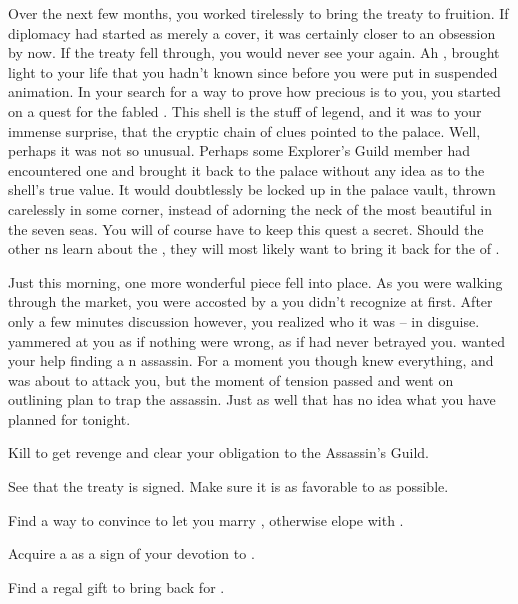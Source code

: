 \documentclass[char]{NeptuneBall}
\begin{document}
Over the next few months, you worked tirelessly to bring the treaty to fruition. If diplomacy had started as merely a cover, it was certainly closer to an obsession by now. If the treaty fell through, you would never see your \cPrincess{} again. Ah \cPrincess{}, \cPrincess{\they} brought light to your life that you hadn't known since before you were put in suspended animation. In your search for a way to prove how precious \cPrincess{} is to you, you started on a quest for the fabled \iGlowShell{}. This shell is the stuff of legend, and it was to your immense surprise, that the cryptic chain of clues pointed to the \pAtlantis{} palace. Well, perhaps it was not so unusual. Perhaps some Explorer's Guild member had encountered one and brought it back to the palace without any idea as to the shell's true value. It would doubtlessly be locked up in the palace vault, thrown carelessly in some corner, instead of adorning the neck of the most beautiful \cPrincess{\mer} in the seven seas. You will of course have to keep this quest a secret. Should the other \pPacifica{}ns learn about the \iGlowShell{}, they will most likely want to bring it back for the \cPacificanRuler{\King} of \pPacifica{}.

Just this morning, one more wonderful piece fell into place. As you were walking through the market, you were accosted by a \cQueen{\mer} you didn't recognize at first. After only a few minutes discussion however, you realized who it was -- \cQueen{} in disguise. \cQueen{\They} yammered at you as if nothing were wrong, as if \cQueen{\they} had never betrayed you. \cQueen{} wanted your help finding a \pPacifica{}n assassin. For a moment you though \cQueen{\they} knew everything, and was about to attack you, but the moment of tension passed and \cQueen{\they} went on outlining \cQueen{\them} plan to trap the assassin. Just as well that \cQueen{\they} has no idea what you have planned for \cQueen{\them} tonight.

\begin{itemz}[Goals]
  \item Kill \cQueen{} to get revenge and clear your obligation to the Assassin's Guild.
  \item See that the treaty is signed. Make sure it is as favorable to \pPacifica{} as possible.
  \item Find a way to convince \cKing{} to let you marry \cPrincess{}, otherwise elope with \cPrincess{}.  
  \item Acquire a \iGlowShell{} as a sign of your devotion to \cPrincess{}.
  \item Find a regal gift to bring back for \cPacificanRuler{}.
\end{itemz}
\end{document}
